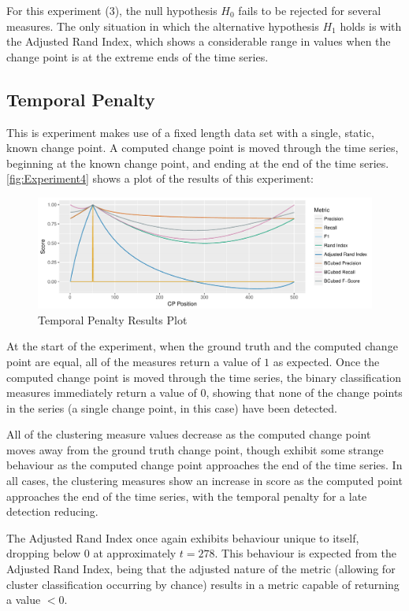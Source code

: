 \documentclass{uvamscse}	%
\begin{document}
For this experiment (3), the null hypothesis $H_0$ fails to be rejected for several measures. The only situation in which the alternative hypothesis $H_1$ holds is with the Adjusted Rand Index, which shows a considerable range in values when the change point is at the extreme ends of the time series.

\subsection{Temporal Penalty}

This is experiment makes use of a fixed length data set with a single, static, known change point. A computed change point is moved through the time series, beginning at the known change point, and ending at the end of the time series. \autoref{fig:Experiment4} shows a plot of the results of this experiment:

\begin{figure}[h]
    \includegraphics[width=\textwidth]{figures/Experiment3}
    \caption{Temporal Penalty Results Plot}
    \label{fig:Experiment4}
\end{figure}

At the start of the experiment, when the ground truth and the computed change point are equal, all of the measures return a value of $1$ as expected. Once the computed change point is moved through the time series, the binary classification measures immediately return a value of $0$, showing that none of the change points in the series (a single change point, in this case) have been detected.

All of the clustering measure values decrease as the computed change point moves away from the ground truth change point, though exhibit some strange behaviour as the computed change point approaches the end of the time series. In all cases, the clustering measures show an increase in score as the computed point approaches the end of the time series, with the temporal penalty for a late detection reducing.

The Adjusted Rand Index once again exhibits behaviour unique to itself, dropping below $0$ at approximately $t=278$. This behaviour is expected from the Adjusted Rand Index, being that the adjusted nature of the metric (allowing for cluster classification occurring by chance) results in a metric capable of returning a value $<0$.
\end{document}

